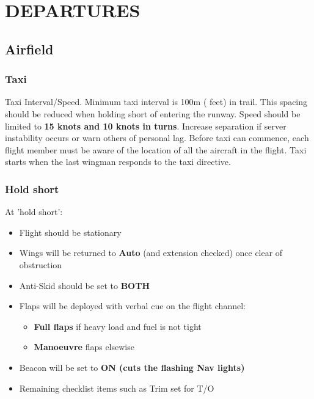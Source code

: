 \section{DEPARTURES}

\subsection{Airfield}

\subsubsection{Taxi}


Taxi Interval/Speed. Minimum taxi interval is 100m ( feet) in
trail. This spacing should be reduced when holding short of entering the
runway. Speed should be limited to \textbf{15 knots and 10 knots in turns}.
Increase separation if server instability occurs or warn others of personal
lag.  Before taxi can commence, each flight member must be aware of the
location of all the aircraft in the flight. Taxi starts when the last wingman
responds to the taxi directive.

\subsubsection{Hold short}

At 'hold short':

\begin{itemize}
  \item Flight should be stationary

  \item Wings will be returned to \textbf{Auto} (and extension checked) once
    clear of obstruction

  \item Anti-Skid should be set to \textbf{BOTH}

  \item Flaps will be deployed with verbal cue on the flight channel:

  \begin{itemize}

    \item \textbf{Full flaps} if heavy load and fuel is not tight

    \item \textbf{Manoeuvre} flaps elsewise

  \end{itemize}

  \item Beacon will be set to \textbf{ON (cuts the flashing Nav lights)}

  \item Remaining checklist items such as Trim set for T/O
\end{itemize}

